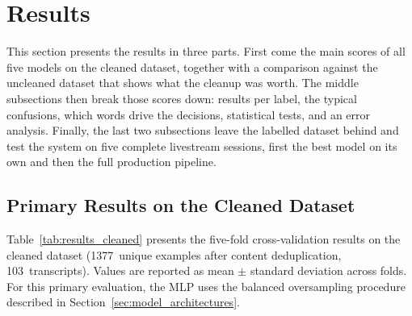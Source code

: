 
\section{Results}
\label{sec:results}

This section presents the results in three parts. First come the main scores of all five models on the cleaned dataset, together with a comparison against the uncleaned dataset that shows what the cleanup was worth. The middle subsections then break those scores down: results per label, the typical confusions, which words drive the decisions, statistical tests, and an error analysis. Finally, the last two subsections leave the labelled dataset behind and test the system on five complete livestream sessions, first the best model on its own and then the full production pipeline.

\subsection{Primary Results on the Cleaned Dataset}
\label{sec:results_cleaned}

Table~\ref{tab:results_cleaned} presents the five-fold cross-validation results on the cleaned dataset (1377~unique examples after content deduplication, 103~transcripts). Values are reported as mean $\pm$ standard deviation across folds. For this primary evaluation, the MLP uses the balanced oversampling procedure described in Section~\ref{sec:model_architectures}.

